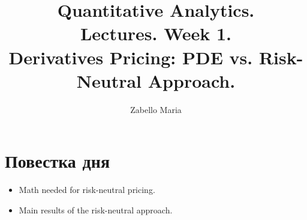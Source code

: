 \documentclass{article}
\title{Quantitative Analytics.\\
Lectures. Week 1. \\
Derivatives Pricing: PDE vs. Risk-Neutral Approach.}
\author{Zabello Maria}
\begin{document}
\maketitle

\setcounter{tocdepth}{1} %
\renewcommand\contentsname{Contents}
\tableofcontents
\newpage




\renewcommand{\labelitemi}{\tiny$\bullet$}
\renewcommand{\figurename}{Fig.}

 \section{Повестка дня}
 \begin{itemize}
     \item Math needed for risk-neutral pricing. 
     \item Main results of the risk-neutral approach.
 \end{itemize}
\end{document}
